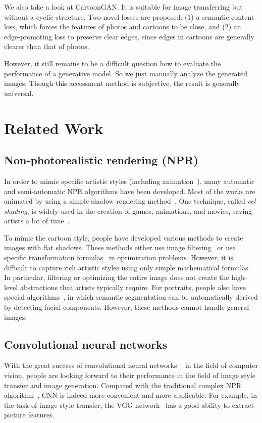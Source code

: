 \documentclass[10pt,twocolumn,letterpaper]{article}
\begin{document}
We also take a look at CartoonGAN. It is suitable for image transferring but
without a cyclic structure. Two novel losses are proposed: (1) a semantic
content loss, which forces the features of photos and cartoons to be close, and
(2) an edge-promoting loss to preserve clear edges, since edges in cartoons are
generally clearer than that of photos.

However, it still remains to be a difficult question how to evaluate the
performance of a generative model. So we just manually analyze the generated
images. Though this accessment method is subjective, the result is generally
universal.

\section{Related Work}

\subsection{Non-photorealistic rendering (NPR)}
In order to mimic specific artistic styles (including
animation~\cite{rosin2012image}), many automatic and semi-automatic NPR
algorithms have been developed. Most of the works are animated by using a simple
shadow rendering method~\cite{saito1990comprehensible}. One technique, called
\textsl{cel shading}, is widely used in the creation of games, animations, and
movies, saving artists a lot of time~\cite{luque2012cel}.

To mimic the cartoon style, people have developed various methods to create
images with flat shadows. These methods either use image
filtering~\cite{winnemoller2006real} or use specific transformation
formulas~\cite{xu2011image} in optimization problems. However, it is difficult
to capture rich artistic styles using only simple mathematical formulas. In
particular, filtering or optimizing the entire image does not create the
high-level abstractions that artists typically require. For portraits, people
also have special algorithms~\cite{yang2010semantics, rosin2015non}, in which
semantic segmentation can be automatically derived by detecting facial
components. However, these methods cannot handle general images.

\subsection{Convolutional neural networks}
With the great success of convolutional neural networks
~\cite{krizhevsky2012imagenet, lawrence1997face} in the field of computer
vision, people are looking forward to their performance in the field of image
style transfer and image generation. Compared with the traditional complex NPR
algorithm~\cite{saito1990comprehensible,luque2012cel}, CNN is indeed more
convenient and more applicable. For example, in the task of image style
transfer, the VGG network~\cite{VGG} has a good ability to extract picture
features.
\end{document}
